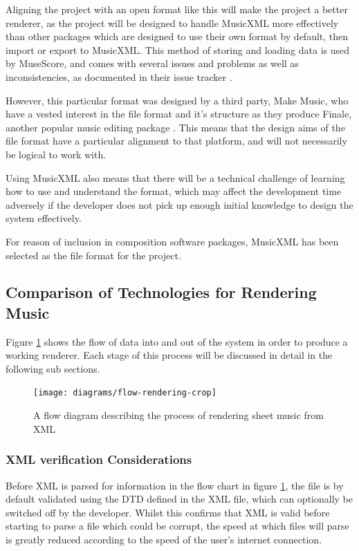 Aligning the project with an open format like this will make the project a better renderer, as the project will be designed to handle MusicXML more effectively than other packages which are designed to use their own format by default, then import or export to MusicXML. This method of storing and loading data is used by MuseScore, and comes with several issues and problems as well as inconsistencies, as documented in their issue tracker \parencite{mscoreBugTracker}.

However, this particular format was designed by a third party, Make Music, who have a vested interest in the file format and it's structure as they produce Finale, another popular music editing package \parencite{mxmlSoft}. This means that the design aims of the file format have a particular alignment to that platform, and will not necessarily be logical to work with.

Using MusicXML also means that there will be a technical challenge of learning how to use and understand the format, which may affect the development time adversely if the developer does not pick up enough initial knowledge to design the system effectively.

For reason of inclusion in composition software packages, MusicXML has been selected as the file format for the project. 

\subsection{Comparison of Technologies for Rendering Music}
Figure \ref{fig:flow} shows the flow of data into and out of the system in order to produce a working renderer. Each stage of this process will be discussed in detail in the following sub sections.

\begin{figure}[H]
	\centering
	\texttt{[image: diagrams/flow-rendering-crop]}
	
	\caption{A flow diagram describing the process of rendering sheet music from XML}	
	\label{fig:flow}
\end{figure}

\subsubsection{XML verification Considerations}
Before XML is parsed for information in the flow chart in figure \ref{fig:flow}, the file is by default validated using the DTD defined in the XML file, which can optionally be switched off by the developer. Whilst this confirms that XML is valid before starting to parse a file which could be corrupt, the speed at which files will parse is greatly reduced according to the speed of the user's internet connection.

